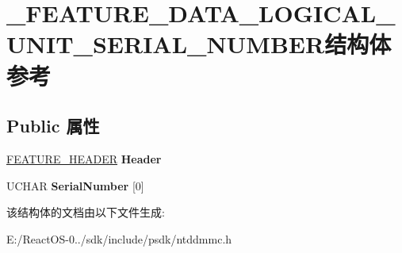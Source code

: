 \hypertarget{struct___f_e_a_t_u_r_e___d_a_t_a___l_o_g_i_c_a_l___u_n_i_t___s_e_r_i_a_l___n_u_m_b_e_r}{}\section{\+\_\+\+F\+E\+A\+T\+U\+R\+E\+\_\+\+D\+A\+T\+A\+\_\+\+L\+O\+G\+I\+C\+A\+L\+\_\+\+U\+N\+I\+T\+\_\+\+S\+E\+R\+I\+A\+L\+\_\+\+N\+U\+M\+B\+E\+R结构体 参考}
\label{struct___f_e_a_t_u_r_e___d_a_t_a___l_o_g_i_c_a_l___u_n_i_t___s_e_r_i_a_l___n_u_m_b_e_r}
\subsection*{Public 属性}
\begin{DoxyCompactItemize}
\item 
\mbox{\label{struct___f_e_a_t_u_r_e___d_a_t_a___l_o_g_i_c_a_l___u_n_i_t___s_e_r_i_a_l___n_u_m_b_e_r_a09d823fc6b3185a9651ce61bd0c8dac3}} 
\hyperlink{struct___f_e_a_t_u_r_e___h_e_a_d_e_r}{F\+E\+A\+T\+U\+R\+E\+\_\+\+H\+E\+A\+D\+ER} {\bfseries Header}
\item 
\mbox{\label{struct___f_e_a_t_u_r_e___d_a_t_a___l_o_g_i_c_a_l___u_n_i_t___s_e_r_i_a_l___n_u_m_b_e_r_a97d2bbff9bbe818d3a38f2bb9dd58cff}} 
U\+C\+H\+AR {\bfseries Serial\+Number} \mbox{[}0\mbox{]}
\end{DoxyCompactItemize}


该结构体的文档由以下文件生成\+:\begin{DoxyCompactItemize}
\item 
E\+:/\+React\+O\+S-\/0../sdk/include/psdk/ntddmmc.\+h\end{DoxyCompactItemize}

